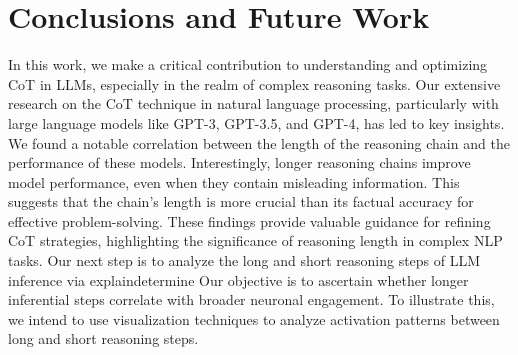 \section{Conclusions and Future Work}
In this work, we make a critical contribution to understanding and optimizing CoT in LLMs, especially in the realm of complex reasoning tasks. Our extensive research on the CoT technique in natural language processing, particularly with large language models like GPT-3, GPT-3.5, and GPT-4, has led to key insights. We found a notable correlation between the length of the reasoning chain and the performance of these models. Interestingly, longer reasoning chains improve model performance, even when they contain misleading information. This suggests that the chain's length is more crucial than its factual accuracy for effective problem-solving. These findings provide valuable guidance for refining CoT strategies, highlighting the significance of reasoning length in complex NLP tasks.
%
Our next step is to analyze the long and short reasoning steps of LLM inference via explaindetermine%
Our objective is to ascertain whether longer inferential steps correlate with broader neuronal engagement. To illustrate this, we intend to use visualization techniques to analyze activation patterns between long and short reasoning steps.
%
